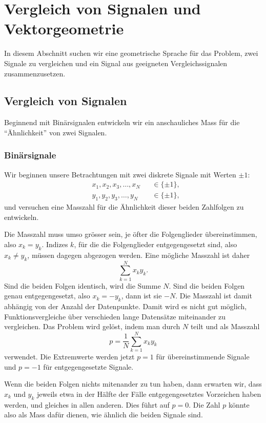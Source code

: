 %
%
%
\section{Vergleich von Signalen und Vektorgeometrie
\label{section:vergleich}}
In diesem Abschnitt suchen wir eine geometrische Sprache für das
Problem, zwei Signale zu vergleichen und ein Signal aus geeigneten
Vergleichssignalen zusammenzusetzen.

\subsection{Vergleich von Signalen}
Beginnend mit Binärsignalen entwickeln wir ein anschauliches Mass für die
``Ähnlichkeit'' von zwei Signalen.

\subsubsection{Binärsignale}
Wir beginnen unsere Betrachtungen mit zwei diskrete Signale mit Werten $\pm 1$:
\begin{align*}
&x_1,x_2,x_3,\dots,x_N &&\in \{\pm 1\},
\\
&y_1,y_2,y_3,\dots,y_N &&\in \{\pm 1\},
\end{align*}
und versuchen eine Masszahl für die Ähnlichkeit dieser beiden
Zahlfolgen zu entwickeln.

Die Masszahl muss umso grösser sein, je öfter die Folgenglieder
übereinstimmen, also $x_k=y_k$.
Indizes $k$, für die die Folgenglieder entgegengesetzt sind, also
$x_k\ne y_k$, müssen dagegen abgezogen werden.
Eine mögliche Masszahl ist daher 
\[
\sum_{k=1}^N x_ky_k.
\]
Sind die beiden Folgen identisch, wird die Summe $N$.
Sind die beiden Folgen genau entgegengesetzt, also $x_k=-y_k$, dann ist
sie $-N$.
Die Masszahl ist damit abhängig von der Anzahl der Datenpunkte.
Damit wird es nicht gut möglich, Funktionsvergleiche über verschieden
lange Datensätze miteinander zu vergleichen.
Das Problem wird gelöst, indem man durch $N$ teilt und als Masszahl
\[
p=\frac{1}{N} \sum_{k=1}^N x_ky_k
\]
verwendet.
Die Extremwerte werden jetzt $p=1$ für übereinstimmende Signale und
$p=-1$ für entgegengesetzte Signale.

Wenn die beiden Folgen nichts mitenander zu tun haben, dann erwarten
wir, dass $x_k$ und $y_k$ jeweils etwa in der Hälfte der Fälle
entgegengesetztes Vorzeichen haben werden, und gleiches in allen
anderen.
Dies führt auf $p=0$.
Die Zahl $p$ könnte also als Mass dafür dienen, wie ähnlich die beiden Signale
sind.

